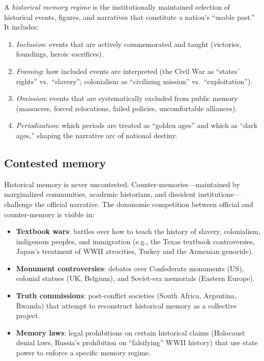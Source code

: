 \begin{definition}
\label{def:memory-regime}
A \emph{historical memory regime} is the institutionally maintained selection of historical events, figures, and narratives that constitute a nation's ``usable past.''
It includes:
\begin{enumerate}[nosep]
  \item \emph{Inclusion}: events that are actively commemorated and taught (victories, foundings, heroic sacrifices).
  \item \emph{Framing}: how included events are interpreted (the Civil War as ``states' rights'' vs.\ ``slavery''; colonialism as ``civilizing mission'' vs.\ ``exploitation'').
  \item \emph{Omission}: events that are systematically excluded from public memory (massacres, forced relocations, failed policies, uncomfortable alliances).
  \item \emph{Periodization}: which periods are treated as ``golden ages'' and which as ``dark ages,'' shaping the narrative arc of national destiny.
\end{enumerate}
\end{definition}

\subsection{Contested memory}

Historical memory is never uncontested.
Counter-memories---maintained by marginalized communities, academic historians, and dissident institutions---challenge the official narrative.
The doxonomic competition between official and counter-memory is visible in:
\begin{itemize}[nosep]
  \item \textbf{Textbook wars}: battles over how to teach the history of slavery, colonialism, indigenous peoples, and immigration (e.g., the Texas textbook controversies, Japan's treatment of WWII atrocities, Turkey and the Armenian genocide).
  \item \textbf{Monument controversies}: debates over Confederate monuments (US), colonial statues (UK, Belgium), and Soviet-era memorials (Eastern Europe).
  \item \textbf{Truth commissions}: post-conflict societies (South Africa, Argentina, Rwanda) that attempt to reconstruct historical memory as a collective project.
  \item \textbf{Memory laws}: legal prohibitions on certain historical claims (Holocaust denial laws, Russia's prohibition on ``falsifying'' WWII history) that use state power to enforce a specific memory regime.
\end{itemize}

